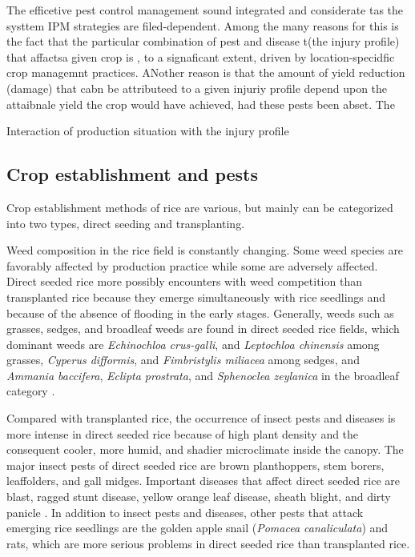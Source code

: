  The efficetive pest control management sound integrated and considerate tas the systtem  IPM strategies are filed-dependent. Among the many reasons for this is the fact that the particular combination of pest and disease t(the injury profile) that affactsa given crop is , to a signaficant extent, driven by location-specidfic crop managemnt practices. ANother reason is that the amount of yield reduction (damage) that cabn be attributeed to a given injuriy profile depend upon the attaibnale yield the crop would have achieved, had these pests been abset. The
 

Interaction of production situation with the injury profile


\subsection*{Crop establishment and pests}

Crop establishment methods of rice are various, but mainly can be categorized into two types, direct seeding and transplanting. 

Weed composition in the rice field is constantly changing. Some weed species are favorably affected by production practice while some are adversely affected. Direct seeded rice more possibly encounters with weed competition than transplanted rice because they emerge simultaneously with rice seedlings and because of the absence of flooding in the early stages. Generally, weeds such as grasses, sedges, and broadleaf weeds are found in direct seeded rice fields, which dominant weeds are \textit{Echinochloa crus-galli}, and \textit{Leptochloa chinensis} among grasses, \textit{Cyperus difformis}, and \textit{Fimbristylis miliacea} among sedges, and \textit{Ammania baccifera}, \textit{Eclipta prostrata}, and \textit{Sphenoclea zeylanica} in the broadleaf category \cite{Juraimi_2013_Sustainable}.

Compared with transplanted rice, the occurrence of insect pests and diseases is more intense in direct seeded rice because of high plant density and the consequent cooler, more humid, and shadier microclimate inside the canopy. The major insect pests of direct seeded rice are brown planthoppers, stem borers, leaffolders, and gall midges. Important diseases that affect direct seeded rice are blast, ragged stunt disease, yellow orange leaf disease, sheath blight, and dirty panicle \citep{Pongprasert_1995_Insect}. In addition to insect pests and diseases, other pests that attack emerging rice seedlings are the golden apple snail (\textit{Pomacea canaliculata}) and rats, which are more serious problems in direct seeded rice than transplanted rice.


